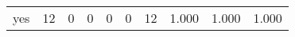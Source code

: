 \begin{longtable}{lp{1.3cm}p{1.3cm}p{1.3cm}p{1.3cm}p{1.3cm}p{1.3cm}p{1.3cm}p{1.3cm}p{1.3cm}}
yes       &                     12 &                                             0 &                                            0 &                                           0 &                                            0 &                                         12 &                                1.000 &                                  1.000 &                                1.000 \\
\end{longtable}
